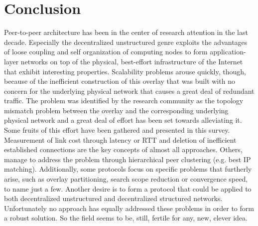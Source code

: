 \section{Conclusion}
\label{section:conclusion}

Peer-to-peer architecture has been in the center of research attention in the
last decade. Especially the decentralized unstructured genre exploits the
advantages of loose coupling and self organization of computing nodes to form
application-layer networks on top of the physical, best-effort infrastructure of
the Internet that exhibit interesting properties. Scalability problems arouse
quickly, though, because of the inefficient construction of this overlay that
was built with no concern for the underlying physical network that causes a
great deal of redundant traffic. The problem was identified by the research
community as the topology mismatch problem between the overlay and the
corresponding underlying physical network and a great deal of effort has been
set towards alleviating it. Some fruits of this effort have been gathered and
presented in this survey. Measurement of link cost through latency or RTT and
deletion of inefficient established connections are the key concepts of almost
all approaches. Others, manage to address the problem through hierarchical peer
clustering (e.g. best IP matching). Additionally, some protocols focus on
specific problems that furtherly arise, such as overlay partitioning, search
scope reduction or convergence speed, to name just a few. Another desire is to
form a protocol that could be applied to both decentralized unstructured and
decentralized structured networks. Unfortunately no approach has equally
addressed these problems in order to form a robust solution. So the field seems
to be, still, fertile for any, new, clever idea.
